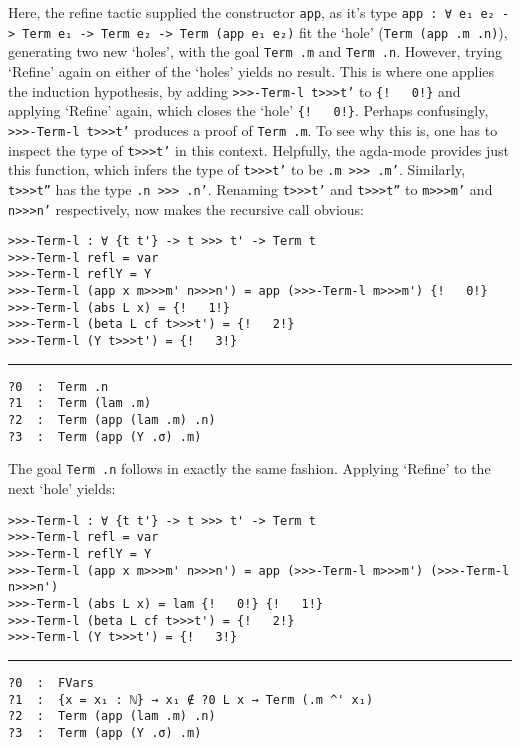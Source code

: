 \documentclass[a4paper, 12pt, twoside]{style/ociamthesis}
\theoremstyle{plain}
\theoremstyle{definition}
\theoremstyle{remark}
\begin{document}
Here, the refine tactic supplied the constructor \texttt{app}, as it's
type \texttt{app : ∀ {e₁ e₂} -> Term e₁ -> Term e₂ -> Term (app e₁ e₂)}
fit the `hole' (\texttt{Term (app .m .n)}), generating two new `holes',
with the goal \texttt{Term .m} and \texttt{Term .n}. However, trying
`Refine' again on either of the `holes' yields no result. This is where
one applies the induction hypothesis, by adding
\texttt{>>>-Term-l t>>>t'} to \texttt{\{!\ \ \ 0!\}} and applying
`Refine' again, which closes the `hole' \texttt{\{!\ \ \ 0!\}}. Perhaps
confusingly, \texttt{>>>-Term-l t>>>t'} produces a proof of
\texttt{Term .m}. To see why this is, one has to inspect the type of
\texttt{t>>>t'} in this context. Helpfully, the agda-mode provides just
this function, which infers the type of \texttt{t>>>t'} to be
\texttt{.m >>> .m'}. Similarly, \texttt{t>>>t''} has the type
\texttt{.n >>> .n'}. Renaming \texttt{t>>>t'} and \texttt{t>>>t''} to
\texttt{m>>>m'} and \texttt{n>>>n'} respectively, now makes the
recursive call obvious:

\begin{verbatim}
>>>-Term-l : ∀ {t t'} -> t >>> t' -> Term t
>>>-Term-l refl = var
>>>-Term-l reflY = Y
>>>-Term-l (app x m>>>m' n>>>n') = app (>>>-Term-l m>>>m') {!   0!}
>>>-Term-l (abs L x) = {!   1!}
>>>-Term-l (beta L cf t>>>t') = {!   2!}
>>>-Term-l (Y t>>>t') = {!   3!}
\end{verbatim}

\noindent\rule{8cm}{0.4pt}

\begin{verbatim}
?0  :  Term .n
?1  :  Term (lam .m)
?2  :  Term (app (lam .m) .n)
?3  :  Term (app (Y .σ) .m)
\end{verbatim}

The goal \texttt{Term .n} follows in exactly the same fashion. Applying
`Refine' to the next `hole' yields:

\begin{verbatim}
>>>-Term-l : ∀ {t t'} -> t >>> t' -> Term t
>>>-Term-l refl = var
>>>-Term-l reflY = Y
>>>-Term-l (app x m>>>m' n>>>n') = app (>>>-Term-l m>>>m') (>>>-Term-l n>>>n')
>>>-Term-l (abs L x) = lam {!   0!} {!   1!}
>>>-Term-l (beta L cf t>>>t') = {!   2!}
>>>-Term-l (Y t>>>t') = {!   3!}
\end{verbatim}

\noindent\rule{8cm}{0.4pt}

\begin{verbatim}
?0  :  FVars
?1  :  {x = x₁ : ℕ} → x₁ ∉ ?0 L x → Term (.m ^' x₁)
?2  :  Term (app (lam .m) .n)
?3  :  Term (app (Y .σ) .m)
\end{verbatim}
\end{document}

